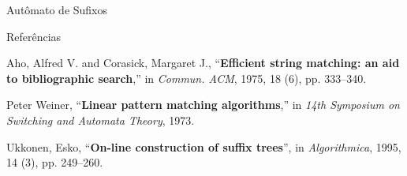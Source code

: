 \documentclass[final]{beamer}
\begin{document}
\begin{frame}[t]
\begin{columns}[t]
\begin{column}{0.60\paperwidth}
\begin{block}{Autômato de Sufixos}
\end{block}
\vspace{-1ex}
\begin{block}{Referências}
	\scriptsize{\begin{thebibliography}{99}
    Aho, Alfred V. and Corasick, Margaret J.,
	``\textbf{Efficient string matching: an aid to bibliographic search},'' in \textit{Commun. ACM}, 1975, 18 (6), pp. 333–340.

    Peter Weiner,
    ``\textbf{Linear pattern matching algorithms},'' in \textit{14th Symposium on Switching and Automata Theory}, 1973.

    Ukkonen, Esko,
    ``\textbf{On-line construction of suffix trees}'', in \textit{Algorithmica}, 1995, 14 (3), pp. 249–260.

	\end{thebibliography}}
\end{block}

\end{column}

\end{columns}
\end{frame}
\end{document}
